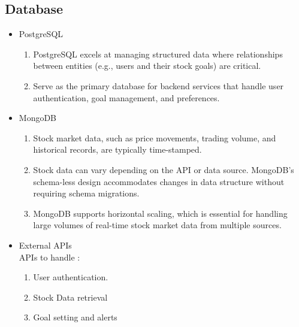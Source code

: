 \subsection{Database}
\begin{itemize}
    \item PostgreSQL
    \begin{enumerate}
        \item PostgreSQL excels at managing structured data where relationships between entities (e.g., users and their stock goals) are critical.
        \item Serve as the primary database for backend services that handle user authentication, goal management, and preferences.
    \end{enumerate}
    \item MongoDB 
    \begin{enumerate}
        \item Stock market data, such as price movements, trading volume, and historical records, are typically time-stamped.
        \item Stock data can vary depending on the API or data source. MongoDB's schema-less design accommodates changes in data structure without requiring schema migrations.
        \item MongoDB supports horizontal scaling, which is essential for handling large volumes of real-time stock market data from multiple sources.
    \end{enumerate}
    \item External APIs \\{APIs to handle :}
  \begin{enumerate}
  
      \item User authentication.
      \item Stock Data retrieval
      \item Goal setting and alerts
  \end{enumerate}
    
\end{itemize}

